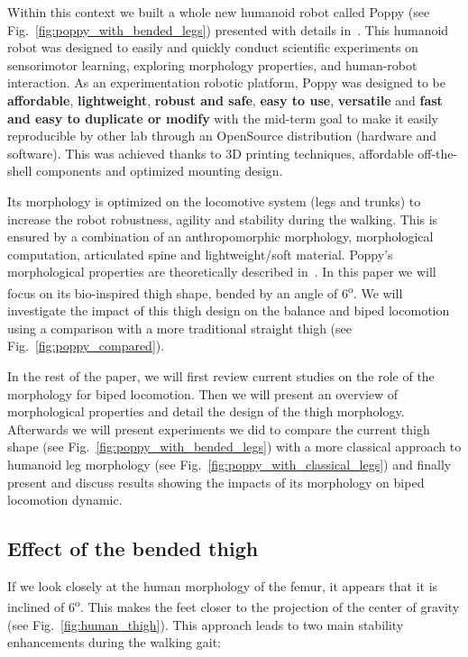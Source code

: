 Within this context we built a whole new humanoid robot called Poppy (see Fig.~\ref{fig:poppy_with_bended_legs}) presented with details in~\cite{lapeyre2013poppy}.
This humanoid robot was designed to easily and quickly conduct scientific experiments on sensorimotor learning, exploring morphology properties, and human-robot interaction.
As an experimentation robotic platform, Poppy was designed to be \textbf{affordable}, \textbf{lightweight}, \textbf{robust and safe}, \textbf{easy to use}, \textbf{versatile} and \textbf{fast and easy to duplicate or modify} with the mid-term goal to make it easily reproducible by other lab through an OpenSource distribution (hardware and software).
This was achieved thanks to 3D printing techniques, affordable off-the-shell components and optimized mounting design.

Its morphology is optimized on the locomotive system (legs and trunks) to increase the robot robustness, agility and stability during the walking.
This is ensured by a combination of an anthropomorphic morphology, morphological computation, articulated spine and lightweight/soft material.
Poppy's morphological properties are theoretically described in~\cite{lapeyre2013poppy}.
In this paper we will focus on its bio-inspired thigh shape, bended by an angle of 6\textsuperscript{o}.
We will investigate the impact of this thigh design on the balance and biped locomotion using a comparison with a more traditional straight thigh (see Fig.~\ref{fig:poppy_compared}).

In the rest of the paper, we will first review current studies on the role of the morphology for biped locomotion.
Then we will present an overview of morphological properties and detail the design of the thigh morphology.
Afterwards we will present experiments we did to compare the current thigh shape (see Fig.~\ref{fig:poppy_with_bended_legs}) with a more classical approach to humanoid leg morphology (see Fig.~\ref{fig:poppy_with_classical_legs}) and finally present and discuss results showing the impacts of its morphology on biped locomotion dynamic.

\subsection{Effect of the bended thigh} %
\label{sub:effect_of_the_bended_thigh}
If we look closely at the human morphology of the femur, it appears that it is inclined of
6\textsuperscript{o}.
This makes the feet closer to the projection of the center of gravity (see
Fig.~\ref{fig:human_thigh}).
This approach leads to two main stability enhancements during the
walking gait:

